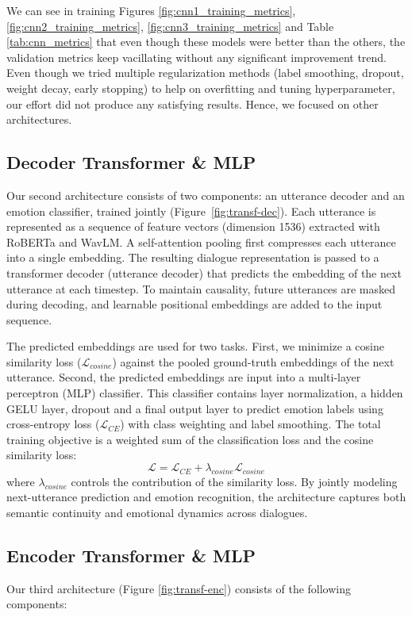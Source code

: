\documentclass{article}
\begin{document}
We can see in training Figures \ref{fig:cnn1_training_metrics}, \ref{fig:cnn2_training_metrics}, \ref{fig:cnn3_training_metrics} and Table \ref{tab:cnn_metrics} that even though these models were better than the others, the validation metrics keep vacillating without any significant improvement trend.
Even though we tried multiple regularization methods (label smoothing, dropout, weight decay, early stopping) to help on overfitting and tuning hyperparameter, our effort did not produce any satisfying results. Hence, we focused on other architectures.

\subsection{Decoder Transformer \& MLP}
Our second architecture consists of two components: an utterance decoder and an emotion classifier, trained jointly (Figure~\ref{fig:transf-dec}). Each utterance is represented as a sequence of feature vectors (dimension 1536) extracted with RoBERTa and WavLM. A self-attention pooling first compresses each utterance into a single embedding. The resulting dialogue representation is passed to a transformer decoder (utterance decoder) that predicts the embedding of the next utterance at each timestep. To maintain causality, future utterances are masked during decoding, and learnable positional embeddings are added to the input sequence.

The predicted embeddings are used for two tasks. First, we minimize a cosine similarity loss ($\mathcal{L}_{cosine}$) against the pooled ground-truth embeddings of the next utterance. Second, the predicted embeddings are input into a multi-layer perceptron (MLP) classifier. This classifier contains layer normalization, a hidden GELU layer, dropout and a final output layer to predict emotion labels using cross-entropy loss ($\mathcal{L}_{CE}$) with class weighting and label smoothing. The total training objective is a weighted sum of the classification loss and the cosine similarity loss:
\[
\mathcal{L}=\mathcal{L}_{CE}+ \lambda_{cosine} \mathcal{L}_{cosine}
\]
where $\lambda_{cosine}$ controls the contribution of the similarity loss. By jointly modeling next-utterance prediction and emotion recognition, the architecture captures both semantic continuity and emotional dynamics across dialogues. 


\subsection{Encoder Transformer \& MLP}
Our third architecture (Figure \ref{fig:transf-enc}) consists of the following components:
\end{document}
